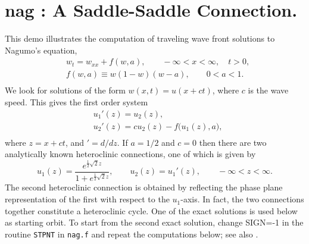 \documentclass[12pt]{report}
\begin{document}
\section{ nag : A Saddle-Saddle Connection.} \label{sec:Demos_nag}
This demo illustrates the computation of traveling wave front solutions
to Nagumo's equation,
\begin{equation} \begin{array}{cl}
  & w_t = w_{xx} + f(w,a),
  \qquad -\infty < x < \infty,
  \quad  t > 0,  \\
  & f(w,a) \equiv w(1-w)(w-a), \qquad 0<a<1.  \\
\end{array} \end{equation}
We look for solutions of the form $w(x,t)=u(x+ct)$, where
$c$ is the wave speed.
This gives the first order system
\begin{equation} \begin{array}{cl}
  &  u_1'(z)  = u_2(z),  \\
  &  u_2'(z)  = c u_2(z) - f\bigl(u_1(z),a\bigr),  \\
\end{array} \end{equation}
where $z=x+ct$, and $' = d/dz$.
If $a=1/2$ and $c=0$ then there are two analytically known
heteroclinic connections, one of which is given by
$$ u_1(z) = \frac{
  {e^{\frac{1}{2} \sqrt{2} z}}
  }{
  {1 + e^{\frac{1 }{ 2} \sqrt{2} z}}  },
  \qquad  u_2(z) = u_1'(z),  \qquad  -\infty < z < \infty.
  $$
The second heteroclinic connection is obtained by reflecting the
phase plane representation of the first with respect to the
$u_1$-axis.
In fact, the two connections together constitute a heteroclinic cycle.
One of the exact solutions is used below as starting orbit.
To start from the second exact solution, change SIGN=-1 in the  
routine {\tt STPNT} in {\tt nag.f} and repeat the computations below;
see also
 \citeyear{FrDo:91}.
\end{document}

